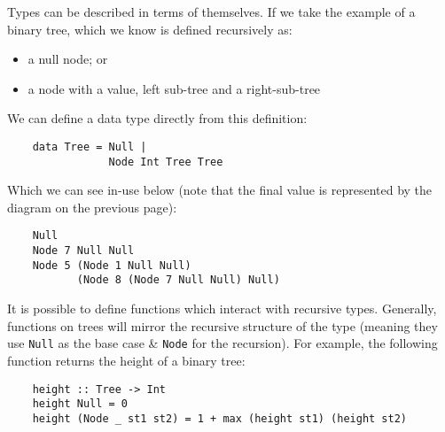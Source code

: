 Types can be described in terms of themselves. If we take the example of a binary tree, which we know is defined recursively as:
\begin{itemize}
    \item a null node; or
    \item a node with a value, left sub-tree and a right-sub-tree
\end{itemize}

We can define a data type directly from this definition:
\begin{verbatim}
    data Tree = Null |
                Node Int Tree Tree
\end{verbatim}

Which we can see in-use below (note that the final value is represented by the diagram on the previous page):
\begin{verbatim}
    Null
    Node 7 Null Null
    Node 5 (Node 1 Null Null)
           (Node 8 (Node 7 Null Null) Null)
\end{verbatim}

It is possible to define functions which interact with recursive types. Generally, functions on trees will mirror the recursive structure of the type (meaning they use \verb|Null| as the base case \& \verb|Node| for the recursion). For example, the following function returns the height of a binary tree:
\begin{verbatim}
    height :: Tree -> Int
    height Null = 0
    height (Node _ st1 st2) = 1 + max (height st1) (height st2)
\end{verbatim}

